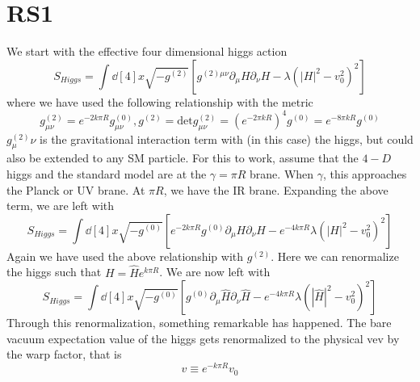 \documentclass[12pt]{article}
\newcommand{\pd}{\partial}
\begin{document}
\section{RS1}
We start with the effective four dimensional higgs action
\begin{equation}
    S_{Higgs} = \int \dd[4]{x}\sqrt{-g^{(2)}} \left[ g^{(2)\mu \nu} \pd_\mu H
    \pd_\nu H - \lambda \left( |H|^2 - v_0^2 \right)^2 \right]
\end{equation}
where we have used the following relationship with the metric
\begin{equation}
    g^{(2)}_{\mu\nu} = e^{-2k\pi R}g^(0)_{\mu\nu}, g^{(2)} = \text{det}
    g_{\mu\nu}^(2) = (e^{-2\pi k R})^4g^{(0)} = e^{-8\pi kR}g^{(0)}
\end{equation}
$g^(2)_\mu\nu$ is the gravitational interaction term with (in this case) the
higgs, but could also be extended to any SM particle. For this to work, assume
that the $4-D$ higgs and the standard model are at the $\gamma = \pi R$ brane.
When $\gamma$, this approaches the Planck or UV brane. At $\pi R$, we have the
IR brane. Expanding the above term, we are left with
\begin{equation}
    S_{Higgs} = \int \dd[4]{x} \sqrt{-g^(0)} \left[ e^{-2k\pi R} g^{(0)} \pd_\mu
    H \pd_\nu H - e^{-4k\pi R} \lambda (|H|^2 - v_0^2 )^2 \right]
\end{equation}
Again we have used the above relationship with $g^{(2)}$. Here we can
renormalize the higgs such that $H = \hat{H}e^{k\pi R}$. We are now left with
\begin{equation}
    S_{Higgs} = \int \dd[4]{x} \sqrt{-g^(0)} \left[ g^{(0)} \pd_\mu
    \hat{H} \pd_\nu \hat{H} - e^{-4k\pi R} \lambda (|\hat{H}|^2 - v_0^2 )^2 \right]
\end{equation}
Through this renormalization, something remarkable has happened. The bare vacuum
expectation value of the higgs gets renormalized to the physical vev by the warp
factor, that is
\begin{equation}
    v \equiv e^{-k\pi R}v_0
\end{equation}
\end{document}
